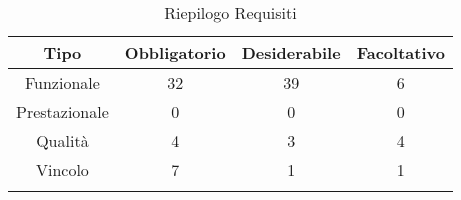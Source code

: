 \normalsize
\begin{longtable}{|c|c|c|c|}
\hline
\textbf{Tipo} & \textbf{Obbligatorio} & \textbf{Desiderabile} & \textbf{Facoltativo}\\
\hline
Funzionale & 32 & 39 & 6\\ \hline
Prestazionale & 0 & 0 & 0\\ \hline
Qualità & 4 & 3 & 4\\ \hline
Vincolo & 7 & 1 & 1\\ \hline
\caption[Riepilogo Requisiti]{Riepilogo Requisiti}
\label{tabella:riepilogorequi}
\end{longtable}
\clearpage

